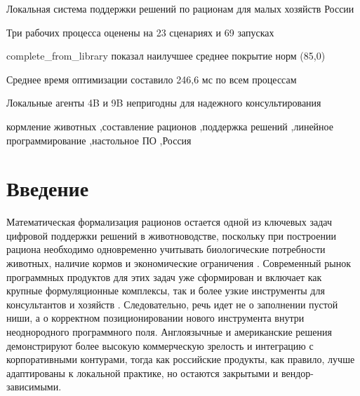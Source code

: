 \documentclass[a4paper,fleqn]{cas-sc}
\begin{document}

\begin{highlights}
\item Локальная система поддержки решений по рационам для малых хозяйств России
\item Три рабочих процесса оценены на 23 сценариях и 69 запусках
\item complete\_from\_library показал наилучшее среднее покрытие норм (85{,}0)
\item Среднее время оптимизации составило 246{,}6 мс по всем процессам
\item Локальные агенты 4B и 9B непригодны для надежного консультирования
\end{highlights}

\begin{keywords}
кормление животных \sep составление рационов \sep поддержка решений \sep линейное программирование \sep настольное ПО \sep Россия
\end{keywords}

\maketitle

\section{Введение}\label{sec:introduction}

Математическая формализация рационов остается одной из ключевых задач цифровой поддержки решений в животноводстве, поскольку при построении рациона необходимо одновременно учитывать биологические потребности животных, наличие кормов и экономические ограничения \citep{nASEM2021, dantzig1963, zhai2020, tedeschi2021smart}. Современный рынок программных продуктов для этих задач уже сформирован и включает как крупные формуляционные комплексы, так и более узкие инструменты для консультантов и хозяйств \citep{datacor2026, mixit2026, winfeed2026, korall2026, deltakorm2026, onecow2026, winmix2026}. Следовательно, речь идет не о заполнении пустой ниши, а о корректном позиционировании нового инструмента внутри неоднородного программного поля. Англоязычные и американские решения демонстрируют более высокую коммерческую зрелость и интеграцию с корпоративными контурами, тогда как российские продукты, как правило, лучше адаптированы к локальной практике, но остаются закрытыми и вендор-зависимыми.
\end{document}
